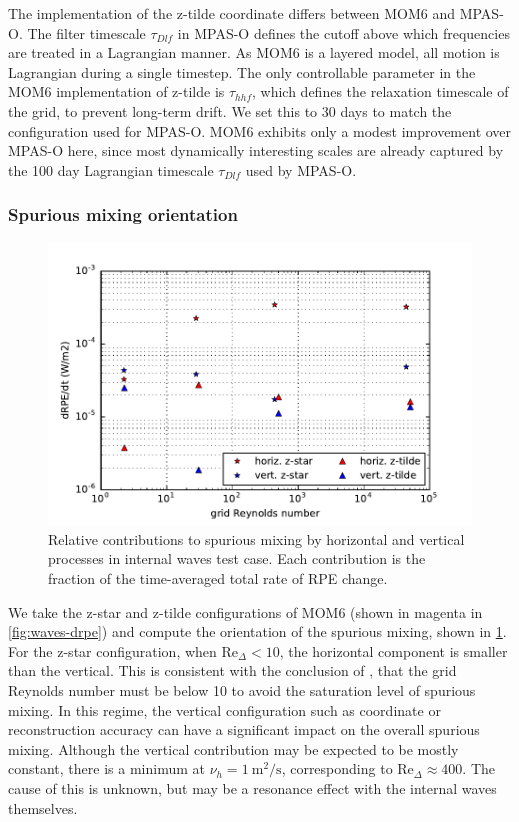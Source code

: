 The implementation of the z-tilde coordinate differs between MOM6 and MPAS-O. The filter timescale $\tau_{Dlf}$ in MPAS-O defines the cutoff above which frequencies are treated in a Lagrangian manner. As MOM6 is a layered model, all motion is Lagrangian during a single timestep. The only controllable parameter in the MOM6 implementation of z-tilde is $\tau_{hhf}$, which defines the relaxation timescale of the grid, to prevent long-term drift. We set this to 30 days to match the configuration used for MPAS-O. MOM6 exhibits only a modest improvement over MPAS-O here, since most dynamically interesting scales are already captured by the 100 day Lagrangian timescale $\tau_{Dlf}$ used by MPAS-O.

\subsubsection{Spurious mixing orientation}
\begin{figure}
  \includegraphics{../plots/internal_waves_drpe_split_abs.pdf}
  \caption{\label{fig:waves-drpesplit} Relative contributions to spurious mixing by horizontal and vertical processes in internal waves test case. Each contribution is the fraction of the time-averaged total rate of RPE change.}
\end{figure}

We take the z-star and z-tilde configurations of MOM6 (shown in magenta in \cref{fig:waves-drpe}) and compute the orientation of the spurious mixing, shown in \cref{fig:waves-drpesplit}. For the z-star configuration, when $\mathrm{Re}_\Delta < 10$, the horizontal component is smaller than the vertical. This is consistent with the conclusion of \citet{ilicak12}, that the grid Reynolds number must be below 10 to avoid the saturation level of spurious mixing. In this regime, the vertical configuration such as coordinate or reconstruction accuracy can have a significant impact on the overall spurious mixing. Although the vertical contribution may be expected to be mostly constant, there is a minimum at $\nu_h = \SI{1}{\square\metre\per\second}$, corresponding to $\mathrm{Re}_\Delta \approx 400$. The cause of this is unknown, but may be a resonance effect with the internal waves themselves.

